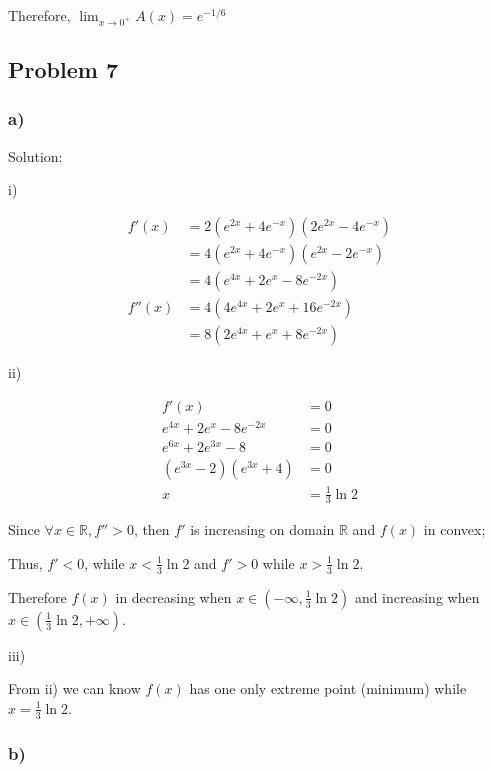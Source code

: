 \documentclass[letterpaper, 11pt]{article}
\newcommand{\1}{\mathds{1}}	%
\theoremstyle{definition}
\begin{document}
  Therefore, $\lim_{x \to 0 ^{+}} A(x) = e ^{-1/6}$

  \subsection*{Problem 7}

  \subsubsection*{a)}

  Solution:

  i)

  \begin{align*}
    f'(x)  & = 2(e ^{2x} + 4e ^{-x})(2e ^{2x} -4e ^{-x}) \\
           & = 4(e ^{2x} + 4e ^{-x})(e ^{2x} - 2e ^{-x}) \\
           & = 4 (e ^{4x} + 2e ^{x} - 8e ^{-2x})         \\
    f''(x) & = 4(4e ^{4x} + 2e ^{x} + 16e ^{-2x})        \\
           & = 8(2e ^{4x} + e ^{x} + 8e ^{-2x})
  \end{align*}

  ii)

  \begin{align*}
    f'(x)                         & = 0               \\
    e ^{4x} + 2e ^{x} - 8e ^{-2x} & = 0               \\
    e ^{6x} + 2e ^{3x} - 8        & =0                \\
    (e ^{3x} - 2)(e ^{3x} + 4)    & = 0               \\
    x                             & = \frac{1}{3}\ln2
  \end{align*}

  Since $\forall x \in \mathbb{R}, f'' > 0$, then $f'$ is increasing on domain $\mathbb{R}$ and $f(x)$ in convex;

  Thus, $f' < 0$, while $x < \frac{1}{3}\ln2$ and $f' > 0$ while $ x > \frac{1}{3}\ln2$.

  Therefore $f(x)$ in decreasing when $x \in (-\infty, \frac{1}{3}\ln2)$ and increasing when $x \in (\frac{1}{3}\ln2, +\infty)$.

  iii)

  From ii) we can know $f(x)$ has one only extreme point (minimum) while $x = \frac{1}{3}\ln2$.


  \subsubsection*{b)}
\end{document}
